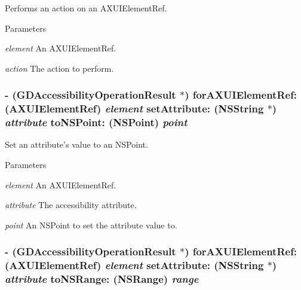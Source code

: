 Performs an action on an AXUIElementRef. 
\begin{DoxyParams}{Parameters}
\item[{\em element}]An AXUIElementRef. \item[{\em action}]The action to perform. \end{DoxyParams}
\hypertarget{interface_g_d_accessibility_manager_aebd9e4bd904df0513641112d83df41d8}{
\subsubsection[{forAXUIElementRef:setAttribute:toNSPoint:}]{\setlength{\rightskip}{0pt plus 5cm}-\/ ({\bf GDAccessibilityOperationResult} $\ast$) forAXUIElementRef: (AXUIElementRef) {\em element}\/ setAttribute: (NSString $\ast$) {\em attribute}\/ toNSPoint: (NSPoint) {\em point}}}
\label{interface_g_d_accessibility_manager_aebd9e4bd904df0513641112d83df41d8}


Set an attribute's value to an NSPoint. 
\begin{DoxyParams}{Parameters}
\item[{\em element}]An AXUIElementRef. \item[{\em attribute}]The accessibility attribute. \item[{\em point}]An NSPoint to set the attribute value to. \end{DoxyParams}
\hypertarget{interface_g_d_accessibility_manager_acabbfd253bc37b73d799978bcabb37b4}{
\subsubsection[{forAXUIElementRef:setAttribute:toNSRange:}]{\setlength{\rightskip}{0pt plus 5cm}-\/ ({\bf GDAccessibilityOperationResult} $\ast$) forAXUIElementRef: (AXUIElementRef) {\em element}\/ setAttribute: (NSString $\ast$) {\em attribute}\/ toNSRange: (NSRange) {\em range}}}
\label{interface_g_d_accessibility_manager_acabbfd253bc37b73d799978bcabb37b4}


